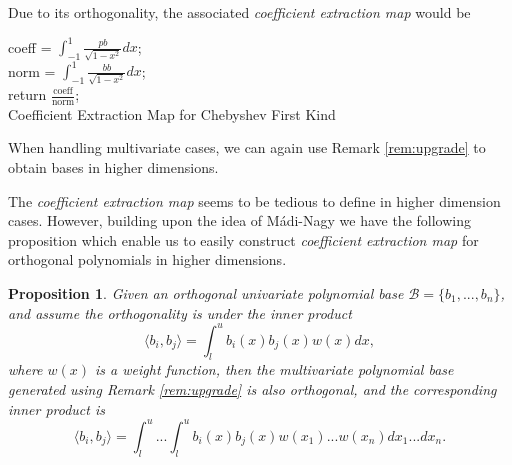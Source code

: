 \documentclass[12pt]{amsart}
\numberwithin{equation}{section}
\newtheorem{prop}[thm]{Proposition}
\theoremstyle{definition}
\numberwithin{thm}{section}
\begin{document}
Due to its orthogonality, the associated \emph{coefficient extraction map} would be 

\begin{algorithm}[H]
     \SetAlgoLined
     coeff = $\int_{-1}^1 \frac{pb}{\sqrt{1-x^2}} dx$;\\
     norm = $\int_{-1}^1 \frac{bb}{\sqrt{1-x^2}} dx$;\\
     return $\frac{\text{coeff}}{\text{norm}}$;\\
     \caption{Coefficient Extraction Map for Chebyshev First Kind}
\end{algorithm}

When handling multivariate cases, we can again use Remark \ref{rem:upgrade} to obtain bases in higher dimensions.

The \emph{coefficient extraction map} seems to be tedious to define in higher dimension cases.
However, building upon the idea of Mádi-Nagy we have the following proposition which enable us to easily 
construct \emph{coefficient extraction map} for orthogonal polynomials in higher dimensions. \cite{M-Nagy2012}

\begin{prop}
     \label{prop:COOLPROP}
     Given an orthogonal univariate polynomial base $\mathcal{B} = \{b_1, ..., b_n\}$, and assume the orthogonality is under the inner product 
     \begin{equation*}
          \langle b_i, b_j \rangle = \int_l^u b_i(x)b_j(x)w(x) dx,
     \end{equation*}
     where $w(x)$ is a weight function, 
     then the multivariate polynomial base generated using Remark \ref{rem:upgrade} is also orthogonal, and the corresponding inner product is
     \begin{equation*}
          \langle b_i, b_j \rangle = \int_l^u...\int_l^u  b_i(x)b_j(x)w(x_1)...w(x_n) dx_1 ... dx_n.
     \end{equation*}
\end{prop}
\end{document}
